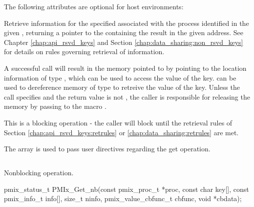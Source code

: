 \reqattrend

\optattrstart
The following attributes are optional for host environments:


\optattrend

\descr

Retrieve information for the specified  associated with the process identified in the given , returning a pointer to the  containing the result in the given address. See Chapter \ref{chap:api_rsvd_keys} and Section \ref{chap:data_sharing:non_rsvd_keys} for details on rules governing retrieval of information.

A successful call will result in the memory pointed to by  pointing to the location information of type , which can be used to access the value of the key.  
can be used to dereference memory of type  to retreive the value of the key. 
Unless the call specifies  and the return value is not , the caller is responsible for releasing the memory by passing  to the macro  
.  

This is a blocking operation - the caller will block until the retrieval rules of Section \ref{chap:api_rsvd_keys:retrules} or \ref{chap:data_sharing:retrules} are met.

The  array is used to pass user directives regarding the get operation.

\subsection{}

\summary

Nonblocking  operation.

\format

\cspecificstart
\begin{codepar}
pmix_status_t
PMIx_Get_nb(const pmix_proc_t *proc, const char key[],
            const pmix_info_t info[], size_t ninfo,
            pmix_value_cbfunc_t cbfunc, void *cbdata);
\end{codepar}
\cspecificend

\begin{arglist}
\end{arglist}

